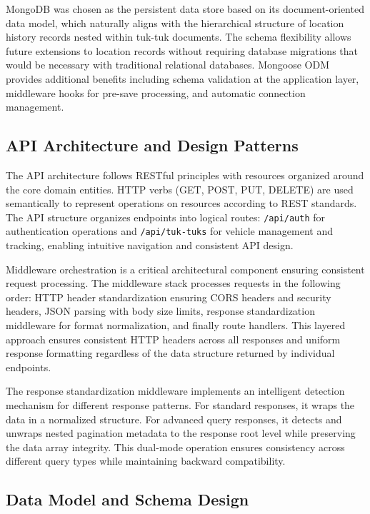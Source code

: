 \documentclass[12pt,a4paper]{article}
\begin{document}
MongoDB was chosen as the persistent data store based on its document-oriented data model, which naturally aligns with the hierarchical structure of location history records nested within tuk-tuk documents. The schema flexibility allows future extensions to location records without requiring database migrations that would be necessary with traditional relational databases. Mongoose ODM provides additional benefits including schema validation at the application layer, middleware hooks for pre-save processing, and automatic connection management.

\subsection{API Architecture and Design Patterns}

The API architecture follows RESTful principles with resources organized around the core domain entities. HTTP verbs (GET, POST, PUT, DELETE) are used semantically to represent operations on resources according to REST standards. The API structure organizes endpoints into logical routes: \texttt{/api/auth} for authentication operations and \texttt{/api/tuk-tuks} for vehicle management and tracking, enabling intuitive navigation and consistent API design.

Middleware orchestration is a critical architectural component ensuring consistent request processing. The middleware stack processes requests in the following order: HTTP header standardization ensuring CORS headers and security headers, JSON parsing with body size limits, response standardization middleware for format normalization, and finally route handlers. This layered approach ensures consistent HTTP headers across all responses and uniform response formatting regardless of the data structure returned by individual endpoints.

The response standardization middleware implements an intelligent detection mechanism for different response patterns. For standard responses, it wraps the data in a normalized structure. For advanced query responses, it detects and unwraps nested pagination metadata to the response root level while preserving the data array integrity. This dual-mode operation ensures consistency across different query types while maintaining backward compatibility.

\subsection{Data Model and Schema Design}
\end{document}
